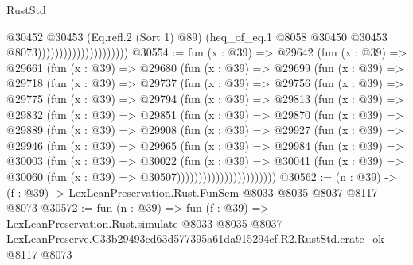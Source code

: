 \begin{lexlean}{RustStd}
\begin{coremodule}
                                          @30452
                                            @30453
                                            (Eq.refl.{2} (Sort 1) @89)
                                            (heq_of_eq.{1}
                                              @8058
                                              @30450
                                              @30453
                                              @8073)))))))))))))))))))))
@30554 := fun (x : @39) =>
  @29642
    (fun (x : @39) =>
    @29661
      (fun (x : @39) =>
      @29680
        (fun (x : @39) =>
        @29699
          (fun (x : @39) =>
          @29718
            (fun (x : @39) =>
            @29737
              (fun (x : @39) =>
              @29756
                (fun (x : @39) =>
                @29775
                  (fun (x : @39) =>
                  @29794
                    (fun (x : @39) =>
                    @29813
                      (fun (x : @39) =>
                      @29832
                        (fun (x : @39) =>
                        @29851
                          (fun (x : @39) =>
                          @29870
                            (fun (x : @39) =>
                            @29889
                              (fun (x : @39) =>
                              @29908
                                (fun (x : @39) =>
                                @29927
                                  (fun (x : @39) =>
                                  @29946
                                    (fun (x : @39) =>
                                    @29965
                                      (fun (x : @39) =>
                                      @29984
                                        (fun (x : @39) =>
                                        @30003
                                          (fun (x : @39) =>
                                          @30022
                                            (fun (x : @39) =>
                                            @30041
                                              (fun (x : @39) =>
                                              @30060 (fun (x : @39) => @30507)))))))))))))))))))))))
@30562 := (n : @39) -> (f : @39) -> LexLeanPreservation.Rust.FunSem @8033 @8035 @8037 @8117 @8073
@30572 := fun (n : @39) =>
  fun (f : @39) =>
  LexLeanPreservation.Rust.simulate
    @8033
    @8035
    @8037
    LexLeanPreserve.C33b29493cd63d577395a61da915294cf.R2.RustStd.crate_ok
    @8117
    @8073
\end{coremodule}
\end{lexlean}
